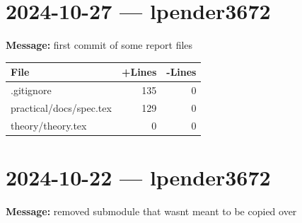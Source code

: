 \documentclass{article}
\begin{document}
\section*{2024-10-27 --- lpender3672}
\textbf{Message:} first commit of some report files

\begin{longtable}{|p{10cm}|r|r|}
\hline \textbf{File} & \textbf{+Lines} & \textbf{-Lines} \\
\hline
.gitignore & 135 & 0 \\
\hline
practical/docs/spec.tex & 129 & 0 \\
\hline
theory/theory.tex & 0 & 0 \\
\hline
\end{longtable}

\section*{2024-10-22 --- lpender3672}
\textbf{Message:} removed submodule that wasnt meant to be copied over
\end{document}
